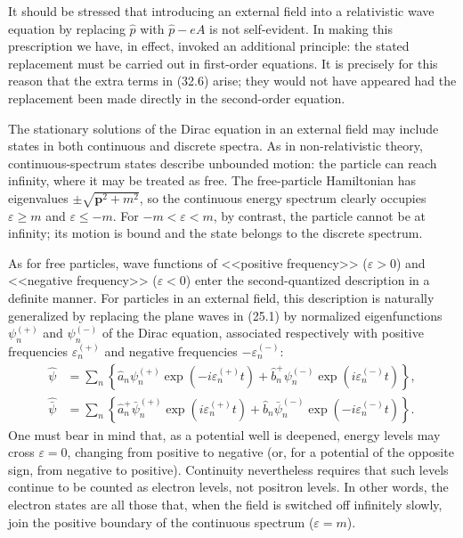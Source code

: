 It should be stressed that introducing an external field into a relativistic wave equation by replacing $\hat p$ with $\hat p-eA$ is not self-evident. In making this prescription we have, in effect, invoked an additional principle: the stated replacement must be carried out in first-order equations. It is precisely for this reason that the extra terms in (32.6) arise; they would not have appeared had the replacement been made directly in the second-order equation.

The stationary solutions of the Dirac equation in an external field may include states in both continuous and discrete spectra. As in non-relativistic theory, continuous-spectrum states describe unbounded motion: the particle can reach infinity, where it may be treated as free. The free-particle Hamiltonian has eigenvalues $\pm\sqrt{\mathbf p^2+m^2}$, so the continuous energy spectrum clearly occupies $\varepsilon\geqslant m$ and $\varepsilon\leqslant-m$. For $-m<\varepsilon<m$, by contrast, the particle cannot be at infinity; its motion is bound and the state belongs to the discrete spectrum.

As for free particles, wave functions of <<positive frequency>> ($\varepsilon>0$) and <<negative frequency>> ($\varepsilon<0$) enter the second-quantized description in a definite manner. For particles in an external field, this description is naturally generalized by replacing the plane waves in (25.1) by normalized eigenfunctions $\psi_n^{(+)}$ and $\psi_n^{(-)}$ of the Dirac equation, associated respectively with positive frequencies $\varepsilon_n^{(+)}$ and negative frequencies $-\varepsilon_n^{(-)}$:
\begin{equation}
\begin{aligned}
\hat\psi&=\sum_n\left\{
\hat a_n\psi_n^{(+)}\exp(-i\varepsilon_n^{(+)}t)
+\hat b_n^+\psi_n^{(-)}\exp(i\varepsilon_n^{(-)}t)
\right\},\\
\widehat{\bar\psi}&=\sum_n\left\{
\hat a_n^+\bar\psi_n^{(+)}\exp(i\varepsilon_n^{(+)}t)
+\hat b_n\bar\psi_n^{(-)}\exp(-i\varepsilon_n^{(-)}t)
\right\}.
\end{aligned}
\tag{32.9}
\end{equation}
One must bear in mind that, as a potential well is deepened, energy levels may cross $\varepsilon=0$, changing from positive to negative (or, for a potential of the opposite sign, from negative to positive). Continuity nevertheless requires that such levels continue to be counted as electron levels, not positron levels. In other words, the electron states are all those that, when the field is switched off infinitely slowly, join the positive boundary of the continuous spectrum ($\varepsilon=m$).

